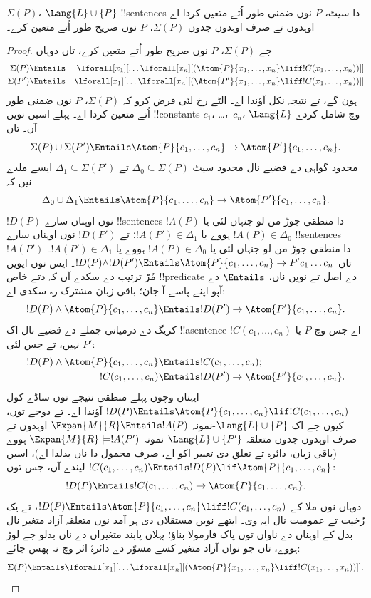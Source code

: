 \documentclass[../../../include/open-logic-section]{subfiles}
\begin{document}
\begin{thm}
$\Sigma(P)$، $\Lang{L}
  \cup\{P\}$-!!{sentence}s دا سیٹ،
$P$ نوں ضمنی طور
اُتے متعین کردا اے اوہدوں تے صرف
اوہدوں جدوں $\Sigma(P)$،
$P$ نوں صریح طور اُتے متعین کرے۔
\end{thm}

\begin{proof}
جے $\Sigma(P)$، $P$ نوں صریح
طور اُتے متعین کرے، تاں دوہاں
\begin{align*}
  \Sigma(P) & \Entails & \lforall[x_1][\dots \lforall[x_n]
    [(\Atom{P}{x_1,\dots, x_n} \liff !C(x_1,\dots,x_n))]]\\
  \Sigma(P') & \Entails & \lforall[x_1][\dots \lforall[x_n]
    [(\Atom{P'}{x_1,\dots, x_n} \liff !C(x_1,\dots,x_n))]]
\end{align*}
ہون گے، تے نتیجہ نکل آؤندا اے۔
الٹے رخ لئی فرض کرو کہ $\Sigma(P)$،
$P$ نوں ضمنی طور اُتے متعین کردا
اے۔ پہلے اسیں نویں !!{constant}s
$c_1$، \dots،~$c_n$،
$\Lang{L}$ وچ شامل کردے آں۔ تاں
\[
\Sigma(P) \cup \Sigma(P') \Entails
\Atom{P}{c_1, \dots, c_n} \to  \Atom{P'}{c_1, \dots, c_n}.
\]
محدود گواہی دے قضیے نال محدود سیٹ
$\Delta_0 \subseteq \Sigma(P)$
تے $\Delta_1 \subseteq \Sigma(P')$
ایسے ملدے نیں کہ
\[
\Delta_0 \cup \Delta_1 \Entails
\Atom{P}{c_1, \dots, c_n} \to \Atom{P'}{c_1, \dots, c_n}.
\]
$!D(P)$ نوں اوہناں سارے
!!{sentence}s $!A(P)$ دا منطقی جوڑ من لو
جنہاں لئی یا $!A(P) \in \Delta_0$
ہووے یا $!A(P') \in \Delta_1$؛
تے $!D(P')$ نوں اوہناں سارے
!!{sentence}s $!A(P')$ دا منطقی جوڑ من لو
جنہاں لئی یا $!A(P) \in \Delta_0$
ہووے یا $!A(P') \in \Delta_1$۔
تاں $!D(P) \land
!D(P') \Entails \Atom{P}{c_1, \dots, c_n} \to P'c_1\dots c_n$۔
ایس نوں ایویں مُڑ ترتیب دے
سکدے آں کہ دتے خاص !!{predicate} دے اصل تے نویں ناں،
$\Entails$ دے آپو اپنے پاسے آ جان؛ باقی زبان مشترک رہ سکدی اے:
\[
!D(P) \land \Atom{P}{c_1, \dots, c_n} \Entails
!D(P') \to \Atom{P'}{c_1, \dots, c_n}.
\]
کریگ دے درمیانی جملے دے قضیے نال
اک !!a{sentence} $!C(c_1,\dots, c_n)$
اے جس وچ $P$ یا $P'$ نہیں، تے
جس لئی:
\begin{align*}
  !D(P) \land \Atom{P}{c_1, \dots, c_n} & \Entails !C(c_1,\dots, c_n); \\
  !C(c_1,\dots, c_n) & \Entails !D(P') \to \Atom{P'}{c_1, \dots, c_n}.
\end{align*}
ایہناں وچوں پہلے منطقی نتیجے
توں ساڈے کول
$!D(P) \Entails
\Atom{P}{c_1,\dots, c_n} \lif !C(c_1,\dots, c_n)$
آؤندا اے۔ تے دوجے توں، کیوں جے
اک $\Lang{L} \cup \{P\}$-نمونہ
$\Expan{M}{R}
\Entails !A(P)$ اوہدوں تے صرف
اوہدوں جدوں متعلقہ
$\Lang{L} \cup
\{P'\}$-نمونہ
$\Expan{M}{R} \models !A(P')$
ہووے (باقی زبان، دائرہ تے تعلق دی تعبیر اکو اے، صرف
محمول دا ناں بدلدا اے)، اسیں
$!C(c_1,\dots, c_n) \Entails !D(P) \lif \Atom{P}{c_1,\dots, c_n}$
لیندے آں، جس توں:
\[
!D(P) \Entails !C(c_1,\dots,c_n) \to \Atom{P}{c_1,\dots, c_n}.
\]
دوہاں نوں ملا کے
$!D(P) \Entails \Atom{P}{c_1,\dots, c_n}
\liff !C(c_1, \dots, c_n)$،
تے یک رُخیت تے عمومیت نال ایہ وی۔ ایتھے نویں مستقلاں
دی ہر آمد نوں متعلقہ آزاد متغیر نال بدل کے اوہناں دے
ناواں توں پاک فارمولا بناؤ؛ پہلاں پابند متغیراں دے ناں
بدلو جے لوڑ ہووے، تاں جو نواں آزاد متغیر کسے مسوّر دے
دائرۂ اثر وچ نہ پھس جائے:
\[
\Sigma(P) \Entails
\lforall[x_1][\dots\lforall[x_n][(\Atom{P}{x_1,\dots, x_n} \liff
    !C(x_1,\dots, x_n))]].
\]
\end{proof}
\end{document}
